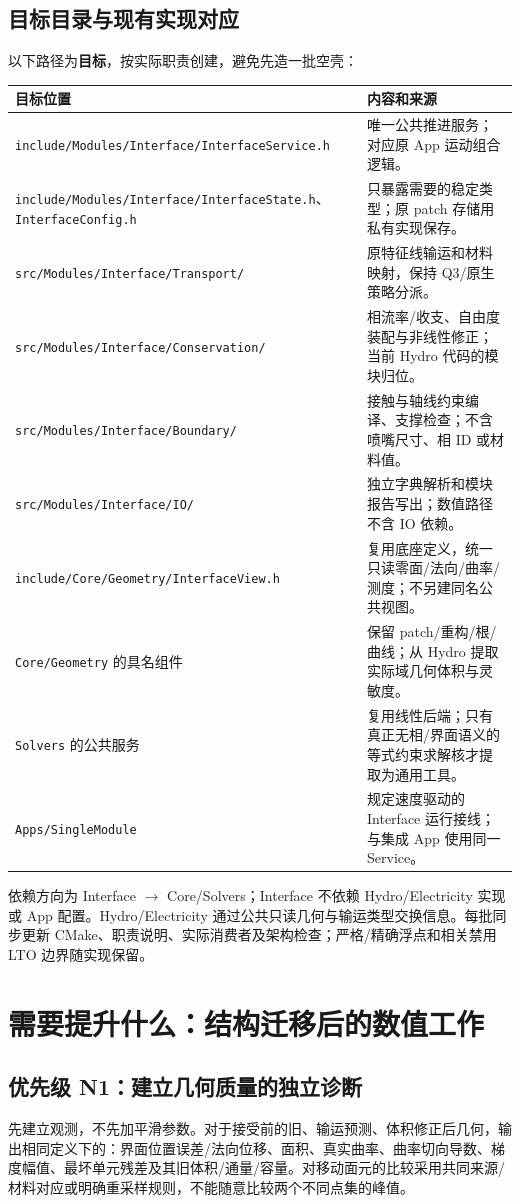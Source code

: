 \documentclass[UTF8,a4paper,11pt,fontset=fandol]{ctexart}
\newcommand{\code}[1]{\nolinkurl{#1}}
\begin{document}
\subsection{目标目录与现有实现对应}
以下路径为\textbf{目标}，按实际职责创建，避免先造一批空壳：
\begin{longtable}{@{}P{.43\textwidth}P{.51\textwidth}@{}}
\toprule 目标位置 & 内容和来源\\\midrule\endhead
\code{include/Modules/Interface/InterfaceService.h} & 唯一公共推进服务；对应原 App 运动组合逻辑。\\
\code{include/Modules/Interface/InterfaceState.h}、\code{InterfaceConfig.h} & 只暴露需要的稳定类型；原 patch 存储用私有实现保存。\\
\code{src/Modules/Interface/Transport/} & 原特征线输运和材料映射，保持 Q3/原生策略分派。\\
\code{src/Modules/Interface/Conservation/} & 相流率/收支、自由度装配与非线性修正；当前 Hydro 代码的模块归位。\\
\code{src/Modules/Interface/Boundary/} & 接触与轴线约束编译、支撑检查；不含喷嘴尺寸、相 ID 或材料值。\\
\code{src/Modules/Interface/IO/} & 独立字典解析和模块报告写出；数值路径不含 IO 依赖。\\
\code{include/Core/Geometry/InterfaceView.h} & 复用底座定义，统一只读零面/法向/曲率/测度；不另建同名公共视图。\\
\code{Core/Geometry} 的具名组件 & 保留 patch/重构/根/曲线；从 Hydro 提取实际域几何体积与灵敏度。\\
\code{Solvers} 的公共服务 & 复用线性后端；只有真正无相/界面语义的等式约束求解核才提取为通用工具。\\
\code{Apps/SingleModule} & 规定速度驱动的 Interface 运行接线；与集成 App 使用同一 Service。\\
\bottomrule
\end{longtable}
依赖方向为 Interface $\to$ Core/Solvers；Interface 不依赖 Hydro/Electricity 实现或 App 配置。Hydro/Electricity 通过公共只读几何与输运类型交换信息。每批同步更新 CMake、职责说明、实际消费者及架构检查；严格/精确浮点和相关禁用 LTO 边界随实现保留。

\section{需要提升什么：结构迁移后的数值工作}
\subsection{优先级 N1：建立几何质量的独立诊断}
先建立观测，不先加平滑参数。对于接受前的旧、输运预测、体积修正后几何，输出相同定义下的：界面位置误差/法向位移、面积、真实曲率、曲率切向导数、梯度幅值、最坏单元残差及其旧体积/通量/容量。对移动面元的比较采用共同来源/材料对应或明确重采样规则，不能随意比较两个不同点集的峰值。
\end{document}
